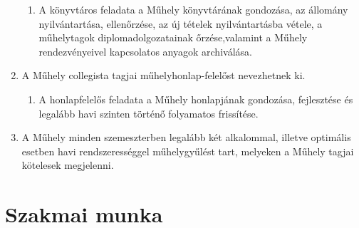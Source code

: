 \documentclass{../styles/rulebook}
\begin{document}
\begin{enumerate}
\begin{enumerate}
		\item  A könyvtáros feladata a Műhely könyvtárának gondozása, az állomány
		nyilvántartása, ellenőrzése, az új tételek nyilvántartásba vétele, a műhelytagok
		diplomadolgozatainak őrzése,valamint a Műhely rendezvényeivel kapcsolatos anyagok
		archiválása.
	\end{enumerate}
	\item A Műhely collegista tagjai műhelyhonlap-felelőst nevezhetnek
	ki. 
	\begin{enumerate}
		\item A honlapfelelős feladata a Műhely honlapjának gondozása, fejlesztése és
		legalább havi szinten történő folyamatos frissítése.
	\end{enumerate}
	\item A Műhely minden szemeszterben legalább két alkalommal, illetve optimális esetben
	havi rendszerességgel műhelygyűlést tart, melyeken a Műhely tagjai kötelesek
	megjelenni. 
\end{enumerate}


\section{Szakmai munka}
\end{document}
